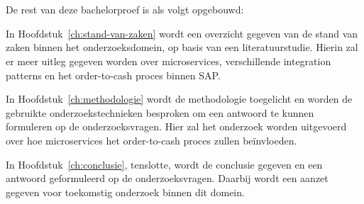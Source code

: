 \section{}
\label{sec:opzet-bachelorproef}


De rest van deze bachelorproef is als volgt opgebouwd:

In Hoofdstuk~\ref{ch:stand-van-zaken} wordt een overzicht gegeven van de stand van zaken binnen het onderzoeksdomein, op basis van een literatuurstudie. Hierin zal er meer uitleg gegeven worden over microservices, verschillende integration patterns en het order-to-cash proces binnen SAP.

In Hoofdstuk~\ref{ch:methodologie} wordt de methodologie toegelicht en worden de gebruikte onderzoekstechnieken besproken om een antwoord te kunnen formuleren op de onderzoeksvragen. Hier zal het onderzoek worden uitgevoerd over hoe microservices het order-to-cash proces zullen beïnvloeden.


In Hoofdstuk~\ref{ch:conclusie}, tenslotte, wordt de conclusie gegeven en een antwoord geformuleerd op de onderzoeksvragen. Daarbij wordt een aanzet gegeven voor toekomstig onderzoek binnen dit domein.
